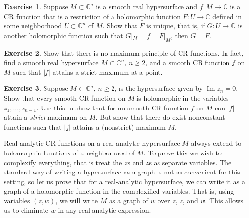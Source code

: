 \documentclass[12pt,openany]{book}
\renewcommand{\Im}{\operatorname{Im}}
\newcommand{\sabs}[1]{\lvert {#1} \rvert}
\newcommand{\C}{{\mathbb{C}}}
\theoremstyle{plain}
\theoremstyle{remark}
\theoremstyle{definition}
\newenvironment{exbox}{%
    \def\FrameCommand{\vrule width 1pt \relax\hspace{10pt}}%
    \MakeFramed{\advance\hsize-\width\FrameRestore}%
}{%
    \endMakeFramed
}
\theoremstyle{exercise}
\newtheorem{exercise}{Exercise}[section]
\theoremstyle{example}
\begin{document}
\begin{exbox}
\begin{exercise}
Suppose $M \subset \C^n$ is a smooth real hypersurface
and $f \colon M \to \C$ is a CR function that is a restriction
of a holomorphic function $F \colon U \to \C$ defined in
some neighborhood $U \subset \C^n$ of $M$.  Show that $F$ is unique,
that is, if $G \colon U \to \C$ is another holomorphic function such that
$G|_M = f = F|_M$, then $G=F$.
\end{exercise}

\begin{exercise}
Show that there is no maximum principle of CR functions.  In fact, find a
smooth real hypersurface $M \subset \C^n$, $n \geq 2$, and a smooth CR function
$f$ on $M$ such that $\sabs{f}$ attains a strict maximum at a point.
\end{exercise}

\begin{exercise}
Suppose $M \subset \C^n$, $n \geq 2$, is the hypersurface given by $\Im z_n
= 0$.  Show that every smooth CR function on $M$ is holomorphic in the variables
$z_1,\ldots,z_{n-1}$.  Use this to show that for no smooth CR function $f$ on $M$ can
$\sabs{f}$ attain a \emph{strict} maximum on $M$.  But show that there do
exist nonconstant functions such that $\sabs{f}$ attains a (nonstrict) maximum $M$.
\end{exercise}
\end{exbox}

Real-analytic CR functions on a real-analytic
hypersurface $M$ always extend to holomorphic functions of a neighborhood of $M$.
To prove this we wish to complexify everything, that is treat the
$z$s and $\bar{z}$s as separate variables.  The standard way of
writing a hypersurface as a graph is not as convenient for this setting, so
let us prove that for a real-analytic hypersurface, we can write it as a
graph of a holomorphic function in the complexified variables.  That is,
using variables $(z,w)$,
we will write $M$ as a graph of $\bar{w}$ over $z$, $\bar{z}$, and $w$.
This allows us to eliminate $\bar{w}$ in any real-analytic
expression.
\end{document}
